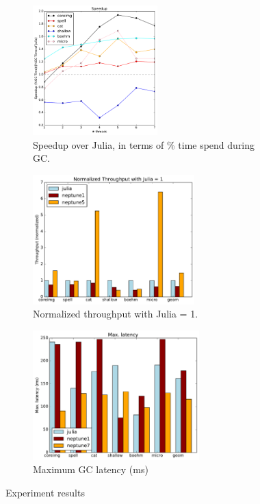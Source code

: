 \begin{figure}[h]
  \centering
    \begin{subfigure}{0.25\textwidth}
      \centering
      \includegraphics[height=5cm]{figures/speedup-julia.pdf}
      \caption{Speedup over Julia, in terms of \% time spend during GC.}
      \label{fig:speedup}
    \end{subfigure}
    \begin{subfigure}{0.32\textwidth}
      \centering
      \includegraphics[height=5cm]{figures/throughput-normalized-julia.pdf}
      
      \caption{Normalized throughput with Julia = 1.}
      \label{fig:throughput}
    \end{subfigure}
    \begin{subfigure}{0.32\textwidth}
      \centering
      \includegraphics[height=5cm]{figures/max-latency.pdf}
      \caption{Maximum GC latency (ms)}
      \label{fig:latency}
    \end{subfigure}
    \vspace{-1em}
    \caption{Experiment results}
  \label{fig:results}
\end{figure}

